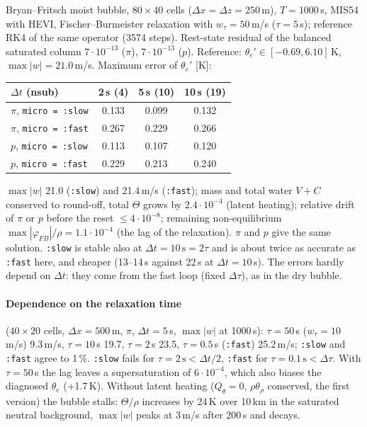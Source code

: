 \documentclass[11pt,a4paper]{article}
\newcommand{\code}[1]{\texttt{#1}}
\newcommand{\dt}{\Delta t}
\begin{document}
Bryan--Fritsch moist bubble, $80\times40$ cells ($\Delta x=\Delta z=250$\,m), $T=1000$\,s, MIS54 with HEVI,
Fischer--Burmeister relaxation with $w_\tau=50$\,m/s ($\tau=5$\,s); reference RK4 of the same operator
(3574 steps). Rest-state residual of the balanced saturated column $7\cdot10^{-13}$ ($\pi$),
$7\cdot10^{-13}$ ($p$). Reference: $\theta_e'\in[-0.69,6.10]$\,K, $\max|w|=21.0$\,m/s. Maximum error of
$\theta_e'$ [K]:
\begin{center}\begin{tabular}{lccc}\toprule
$\dt$ (nsub) & 2\,s (4) & 5\,s (10) & 10\,s (19)\\\midrule
$\pi$, \code{micro = :slow} & 0.133 & 0.099 & 0.132\\
$\pi$, \code{micro = :fast} & 0.267 & 0.229 & 0.266\\
$p$, \code{micro = :slow} & 0.113 & 0.107 & 0.120\\
$p$, \code{micro = :fast} & 0.229 & 0.213 & 0.240\\\bottomrule
\end{tabular}\end{center}
$\max|w|$ 21.0 (\code{:slow}) and 21.4\,m/s (\code{:fast}); mass and total water $V+C$ conserved to round-off, total
$\Theta$ grows by $2.4\cdot10^{-4}$ (latent heating); relative drift of $\pi$ or $p$ before the reset
$\le4\cdot10^{-8}$; remaining non-equilibrium $\max|\varphi_{FB}|/\rho=1.1\cdot10^{-4}$ (the lag of the
relaxation). $\pi$ and $p$ give the same solution. \code{:slow} is stable also at $\dt=10\,\mathrm s=2\tau$
and is about twice as accurate as \code{:fast} here, and cheaper (13--14\,s against 22\,s at $\dt=10$\,s).
The errors hardly depend on $\dt$: they come from the fast loop (fixed $\Delta\tau$), as in the dry bubble.

\paragraph{Dependence on the relaxation time} ($40\times20$ cells, $\Delta x=500$\,m, $\pi$, $\dt=5$\,s,
$\max|w|$ at 1000\,s): $\tau=50$\,s ($w_\tau=10$\,m/s) 9.3\,m/s, $\tau=10$\,s 19.7, $\tau=2$\,s 23.5,
$\tau=0.5$\,s (\code{:fast}) 25.2\,m/s; \code{:slow} and \code{:fast} agree to 1\,\%. \code{:slow} fails for
$\tau=2\,\mathrm s<\dt/2$, \code{:fast} for $\tau=0.1\,\mathrm s<\Delta\tau$. With $\tau=50$\,s the lag
leaves a supersaturation of $6\cdot10^{-4}$, which also biases the diagnosed $\theta_e$ (+1.7\,K). Without
latent heating ($Q_\theta=0$, $\rho\theta_\rho$ conserved, the first version) the bubble stalls: $\Theta/\rho$
increases by 24\,K over 10\,km in the saturated neutral background, $\max|w|$ peaks at 3\,m/s after 200\,s
and decays.
\end{document}
